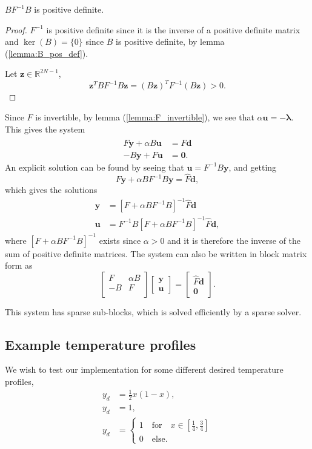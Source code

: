 \begin{lemma}
    $BF^{-1}B$ is positive definite.
\end{lemma}
\begin{proof}
    $F^{-1}$ is positive definite since it is the inverse of a positive definite matrix and $\ker(B) = \{0\}$ since $B$ is positive definite, by lemma (\ref{lemma:B_pos_def}).
    
    Let $\mathbf{z} \in \mathds{R}^{2N-1}$,
    $$\mathbf{z}^T BF^{-1}B \mathbf{z} = (B\mathbf{z})^T F^{-1}(B\mathbf{z}) > 0.$$
\end{proof}
Since $F$ is invertible, by lemma (\ref{lemma:F_invertible}), we see that $\alpha \mathbf{u}= -\mathbf{\lambda}$. 
This gives the system
\begin{align}
    \label{eq:lagrange_conditions}
     F \mathbf{y} + \alpha B \mathbf{u} &= \hat{F}\mathbf{d} \\
    -B \mathbf{y} + F \mathbf{u} &= \mathbf{0}.
\end{align}
An explicit solution can be found by seeing that $\mathbf{u}=F^{-1}B \mathbf{y}$, and getting
$$ F\mathbf{y} + \alpha B F^{-1}B \mathbf{y} = \hat{F}\mathbf{d},$$
which gives the solutions
\begin{align*}
    \mathbf{y} &= \left[F + \alpha B F^{-1}B \right]^{-1} \hat{F}\mathbf{d} \\
    \mathbf{u} &= F^{-1} B \left[F + \alpha B F^{-1}B \right]^{-1} \hat{F}\mathbf{d},
\end{align*}
where $\left[F + \alpha B F^{-1}B \right]^{-1}$ exists since $\alpha > 0$ and it is therefore the inverse of the sum of positive definite matrices.
The system can also be written in block matrix form as
$$
\begin{bmatrix}
   F & \alpha B \\
   -B & F \\
\end{bmatrix}
\begin{bmatrix}
    \mathbf{y} \\
    \mathbf{u}
\end{bmatrix}
= 
\begin{bmatrix} \hat{F}\mathbf{d} \\
    \mathbf{0}
\end{bmatrix}.
$$

This system has sparse sub-blocks, which is solved
efficiently by a sparse solver.

\subsection{Example temperature profiles}
We wish to test our implementation for some different desired temperature profiles,
\begin{align}
    y_d &= \frac{1}{2}x(1-x), \label{eq:des_1} \\
    y_d &= 1, \label{eq:des_2}\\
    y_d &= \begin{cases}
        1 \quad \text{for} \quad x \in \left[ \frac{1}{4}, \frac{3}{4}\right] \\
        0 \quad \text{else}.
    \end{cases} \label{eq:des_3}
\end{align}

